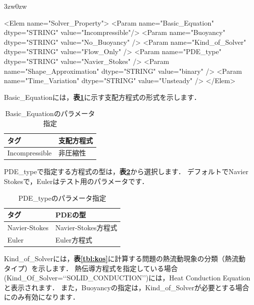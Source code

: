 \begin{indentation}{3zw}{0zw}

{\small
\begin{program}
<Elem name="Solver_Property">
  <Param name="Basic_Equation"       dtype="STRING" value="Incompressible"/>
  <Param name="Buoyancy"             dtype="STRING" value="No_Buoyancy" />
  <Param name="Kind_of_Solver"       dtype="STRING" value="Flow_Only" />
  <Param name="PDE_type"             dtype="STRING" value="Navier_Stokes" />
  <Param name="Shape_Approximation"  dtype="STRING" value="binary" />
  <Param name="Time_Variation"       dtype="STRING" value="Unsteady" />
</Elem>
\end{program}
}

Basic\_Equationには，\textbf{表\ref{tbl:basic_eq}}に示す支配方程式の形式を示します．

\begin{table}[htdp]
\caption{Basic\_Equationのパラメータ指定}
\begin{center}
\small
\begin{tabular}{ll} \toprule
タグ & 支配方程式\\ \midrule
Incompressible & 非圧縮性\\ \bottomrule
\end{tabular}
\end{center}
\label{tbl:basic_eq}
\end{table}

PDE\_typeで指定する方程式の型は，\textbf{表\ref{tbl:PDE type}}から選択します．
デフォルトでNavier Stokesで，Eulerはテスト用のパラメータです．

\begin{table}[htdp]
\caption{PDE\_typeのパラメータ指定}
\begin{center}
\small
\begin{tabular}{ll} \toprule
タグ & PDEの型\\ \midrule
Navier-Stokes & Navier-Stokes方程式\\
Euler & Euler方程式\\ \bottomrule
\end{tabular}
\end{center}
\label{tbl:PDE type}
\end{table}

Kind\_of\_Solverには，\textbf{表\ref{tbl:kos}}に計算する問題の熱流動現象の分類（熱流動タイプ）を示します．
熱伝導方程式を指定している場合(Kind\_Of\_Solver=\lq\lq SOLID\_CONDUCTION\rq\rq )には，Heat Conduction Equationと表示されます．
また，Buoyancyの指定は，Kind\_of\_Solverが必要とする場合にのみ有効になります．


\end{indentation}
